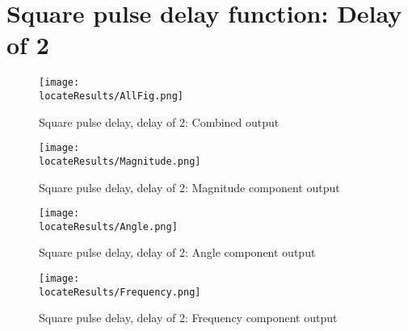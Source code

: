 \newpage
\section{Square pulse  delay function: Delay of 2}

\begin{figure}[hb]
    \texttt{[image: \\locateResults/AllFig.png]}    
    \caption{Square pulse delay, delay of 2: Combined output}
    \label{fig:PMUsim-Sqa2-allfig}
\end{figure}


     \begin{figure}
 
    \texttt{[image: \\locateResults/Magnitude.png]}    
         \label{fig:PMUsim-Sqa2Mag}
        \caption{Square pulse delay, delay of 2: Magnitude component output}
 
\end{figure}

     \begin{figure}
 
   \texttt{[image: \\locateResults/Angle.png]}    
         \label{fig:PMUsim-Sqa2Ang}
        \caption{Square pulse delay, delay of 2: Angle component output}
 
\end{figure}

     \begin{figure}
 
   \texttt{[image: \\locateResults/Frequency.png]}    
         \label{fig:PMUsim-Sqa2Freq}
        \caption{Square pulse delay, delay of 2: Frequency component output}
 
\end{figure}


